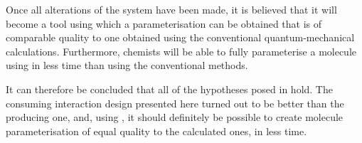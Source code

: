 Once all alterations of the system have been made, it is believed that it will become a tool using which a parameterisation can be obtained that is of comparable quality to one obtained using the conventional quantum-mechanical calculations. Furthermore, chemists will be able to fully parameterise a molecule using \oframp{} in less time than using the conventional methods.

It can therefore be concluded that all of the hypotheses posed in  hold. The consuming interaction design presented here turned out to be better than the producing one, and, using \oframp, it should definitely be possible to create molecule parameterisation of equal quality to the calculated ones, in less time.
